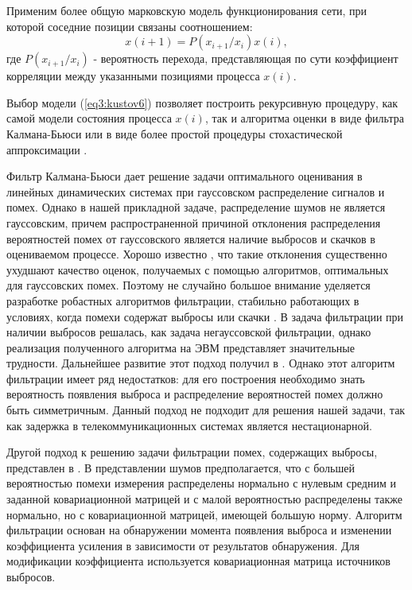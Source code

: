 Применим более общую марковскую модель функционирования сети, при которой соседние позиции связаны соотношением:
\begin{equation}\label{eq3:kustov6}
x(i+1)=P(x_{i+1}/x_i)x(i),
\end{equation}
\noindent где $P(x_{i+1}/x_i)$ - вероятность перехода, представляющая по сути коэффициент корреляции между указанными позициями процесса $x(i)$.

Выбор модели (\ref{eq3:kustov6}) позволяет построить рекурсивную процедуру, как самой модели состояния процесса $x(i)$, так и алгоритма оценки в виде фильтра Калмана-Бьюси или в виде более простой процедуры стохастической аппроксимации \cite{tihonov}.










Фильтр Калмана-Бьюси дает решение задачи оптимального оценивания в линейных динамических системах при гауссовском распределение сигналов и помех.
Однако в нашей прикладной задаче, распределение шумов не является гауссовским, причем распространенной причиной отклонения распределения вероятностей помех от гауссовского является наличие выбросов и скачков в оцениваемом процессе.
Хорошо известно \cite{cipkin}, что такие отклонения существенно ухудшают качество оценок, получаемых с помощью алгоритмов, оптимальных для гауссовских помех.
Поэтому не случайно большое внимание уделяется разработке робастных алгоритмов фильтрации, стабильно работающих в условиях, когда помехи содержат выбросы или скачки \cite{Klekis, masreliez_ieee, masreliez_martin, ershov_lipcer, ershov, RobustFilter}.
В \cite{masreliez_ieee} задача фильтрации при наличии выбросов решалась, как задача   негауссовской фильтрации, однако реализация полученного алгоритма на ЭВМ представляет значительные трудности. 
Дальнейшее развитие этот подход получил в \cite{masreliez_martin}. Однако этот алгоритм фильтрации имеет ряд недостатков: для его построения необходимо знать вероятность появления выброса и распределение вероятностей помех должно быть симметричным. Данный подход не подходит для решения нашей задачи, так как задержка в телекоммуникационных системах является нестационарной.

Другой подход к решению задачи фильтрации помех, содержащих выбросы, представлен в \cite{ershov_lipcer, ershov}. В представлении шумов предполагается, что с большей вероятностью помехи измерения распределены нормально с нулевым средним и заданной ковариационной матрицей и с малой вероятностью распределены также нормально,  но с ковариационной матрицей, имеющей большую норму. Алгоритм фильтрации основан на обнаружении момента появления выброса и изменении коэффициента усиления в зависимости от результатов обнаружения. Для модификации коэффициента используется ковариационная матрица источников выбросов.

